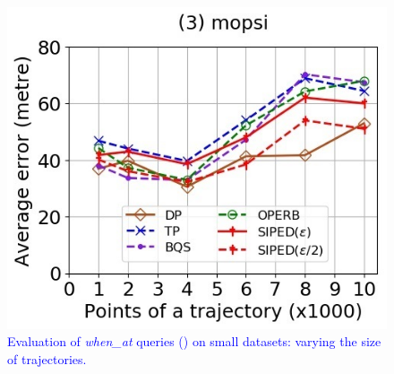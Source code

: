 \begin{figure}[tb!]
	\includegraphics[scale=0.400]{Figures/Exp-when-PED-error-size-mopsi.jpg}		
	\vspace{-2ex}
	\caption{\small \textcolor{blue}{Evaluation of \emph{when\_at} queries (\ped) on small datasets: varying the size of
		trajectories.}}
	\label{fig:query-when-ped-size}
	\vspace{-1ex}
\end{figure}


